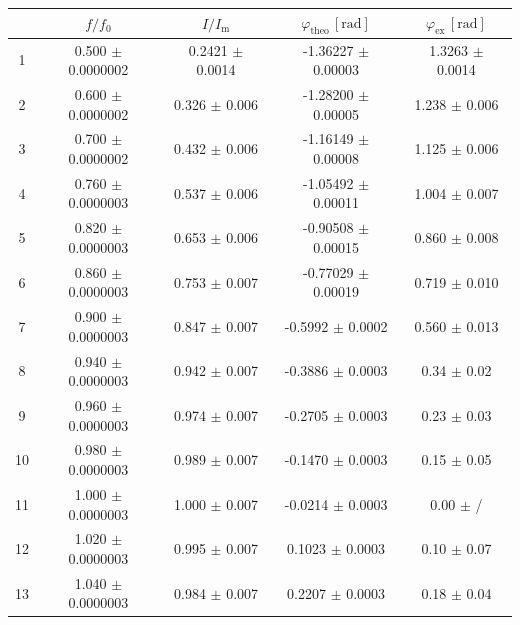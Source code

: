 \documentclass{article}
\begin{document}
\begin{table}[H]\centering
    \begin{tabular}{ccccc}
        \toprule
           & $f/f_0$               & $I/I_\text{m}$      & $\varphi_\text{theo}\,[\text{rad}]$ & $\varphi_\text{ex}\,[\text{rad}]$ \\
        \midrule
        1  & 0.500 $\pm$ 0.0000002 & 0.2421 $\pm$ 0.0014 & -1.36227 $\pm$ 0.00003              & 1.3263 $\pm$ 0.0014               \\
        2  & 0.600 $\pm$ 0.0000002 & 0.326  $\pm$ 0.006  & -1.28200 $\pm$ 0.00005              & 1.238  $\pm$ 0.006                \\
        3  & 0.700 $\pm$ 0.0000002 & 0.432  $\pm$ 0.006  & -1.16149 $\pm$ 0.00008              & 1.125  $\pm$ 0.006                \\
        4  & 0.760 $\pm$ 0.0000003 & 0.537  $\pm$ 0.006  & -1.05492 $\pm$ 0.00011              & 1.004  $\pm$ 0.007                \\
        5  & 0.820 $\pm$ 0.0000003 & 0.653  $\pm$ 0.006  & -0.90508 $\pm$ 0.00015              & 0.860  $\pm$ 0.008                \\
        6  & 0.860 $\pm$ 0.0000003 & 0.753  $\pm$ 0.007  & -0.77029 $\pm$ 0.00019              & 0.719  $\pm$ 0.010                \\
        7  & 0.900 $\pm$ 0.0000003 & 0.847  $\pm$ 0.007  & -0.5992  $\pm$ 0.0002               & 0.560  $\pm$ 0.013                \\
        8  & 0.940 $\pm$ 0.0000003 & 0.942  $\pm$ 0.007  & -0.3886  $\pm$ 0.0003               & 0.34   $\pm$ 0.02                 \\
        9  & 0.960 $\pm$ 0.0000003 & 0.974  $\pm$ 0.007  & -0.2705  $\pm$ 0.0003               & 0.23   $\pm$ 0.03                 \\
        10 & 0.980 $\pm$ 0.0000003 & 0.989  $\pm$ 0.007  & -0.1470  $\pm$ 0.0003               & 0.15   $\pm$ 0.05                 \\
        11 & 1.000 $\pm$ 0.0000003 & 1.000  $\pm$ 0.007  & -0.0214  $\pm$ 0.0003               & 0.00   $\pm$ /                    \\
        12 & 1.020 $\pm$ 0.0000003 & 0.995  $\pm$ 0.007  & 0.1023   $\pm$ 0.0003               & 0.10   $\pm$ 0.07                 \\
        13 & 1.040 $\pm$ 0.0000003 & 0.984  $\pm$ 0.007  & 0.2207   $\pm$ 0.0003               & 0.18   $\pm$ 0.04                 \\

\end{tabular}
\end{table}
\end{document}
